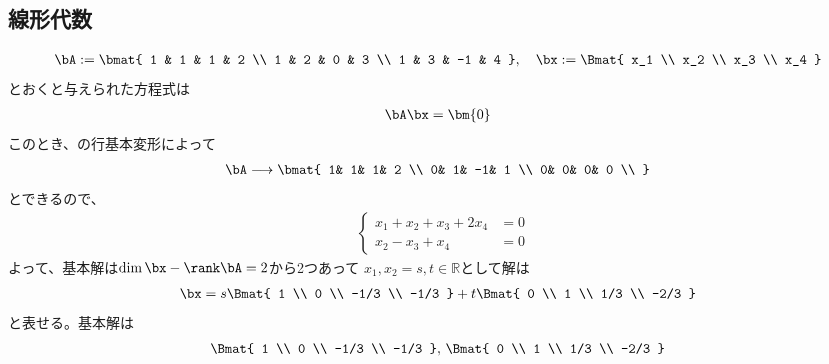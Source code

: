 \subsection{線形代数}
\begin{ans*}
  \begin{gather}
    \bA := \bmat{
      1 & 1 & 1 & 2 \\
      1 & 2 & 0 & 3 \\
      1 & 3 & -1 & 4
    },\quad \bx := \Bmat{
      x_1 \\ x_2 \\ x_3 \\ x_4
    }
  \end{gather}
  とおくと与えられた方程式は
  \begin{align}
    \bA \bx = \bm{0}
  \end{align}
  このとき、\bA の行基本変形によって
  \begin{gather}
    \bA \longrightarrow
    \bmat{
      1& 1& 1& 2 \\
      0& 1& -1& 1 \\
      0& 0& 0& 0 \\
    }
  \end{gather}
  とできるので、
  \begin{align}
    &\left\{
    \begin{aligned}
      x_1 + x_2 + x_3 + 2x_4 &= 0 \\
      x_2 - x_3 + x_4 &= 0
    \end{aligned}
    \right.
  \end{align}
  よって、基本解は$\dim\bx - \rank\bA = 2$から2つあって
  $x_1,x_2 = s,t \in \mathbb{R}$として解は
  \begin{align}
    \bx = s
    \Bmat{
      1 \\ 0 \\ -1/3 \\ -1/3
    }
    + t
    \Bmat{
      0 \\ 1 \\ 1/3 \\ -2/3
    }
  \end{align}
  と表せる。基本解は
  \begin{align}
    \Bmat{
      1 \\ 0 \\ -1/3 \\ -1/3
    },\,
    \Bmat{
      0 \\ 1 \\ 1/3 \\ -2/3
    }
  \end{align}
\end{ans*}


